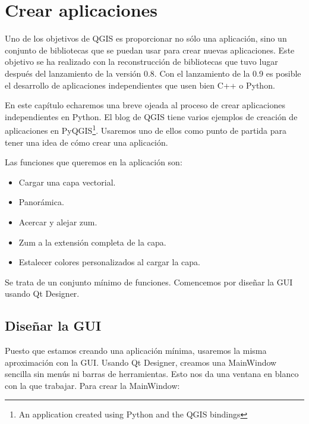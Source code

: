 \section{Crear aplicaciones}

Uno de los objetivos de QGIS es proporcionar no sólo una aplicación, sino un conjunto de
bibliotecas que se puedan usar para crear nuevas aplicaciones. Este objetivo se ha realizado
con la reconstrucción de bibliotecas que tuvo lugar después del lanzamiento de la versión 0.8.
Con el lanzamiento de la 0.9 es posible el desarrollo de aplicaciones independientes que usen
bien C++ o Python.

En este capítulo echaremos una breve ojeada al proceso de crear aplicaciones independientes en
Python. El blog de QGIS tiene varios ejemplos de creación de aplicaciones en
PyQGIS\footnote{An application created using Python and the QGIS bindings}. Usaremos uno de
ellos como punto de partida para tener una idea de cómo crear una aplicación.

Las funciones que queremos en la aplicación son:

\begin{itemize}
\item Cargar una capa vectorial.
\item Panorámica.
\item Acercar y alejar zum.
\item Zum a la extensión completa de la capa.
\item Estalecer colores personalizados al cargar la capa.
\end{itemize} 

Se trata de un conjunto mínimo de funciones. Comencemos por diseñar la GUI usando Qt Designer.

\subsection{Diseñar la GUI}

Puesto que estamos creando una aplicación mínima, usaremos la misma aproximación con la GUI. 
Usando Qt Designer, creamos una MainWindow sencilla sin menús ni barras de herramientas. 
Esto nos da una ventana en blanco con la que trabajar. Para crear la MainWindow:

